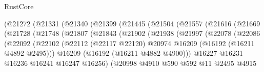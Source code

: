 \begin{lexlean}{RustCore}
\begin{coremodule}
                            (@21272
                              (@21331
                                (@21340
                                  (@21399
                                    (@21445
                                      (@21504
                                        (@21557
                                          (@21616
                                            (@21669
                                              (@21728
                                                (@21748
                                                  (@21807
                                                    (@21843
                                                      (@21902
                                                        (@21938
                                                          (@21997
                                                            (@22078
                                                              (@22086
                                                                (@22092
                                                                  (@22102
                                                                    (@22112
                                                                      (@22117 @22120)
                                                                      @20974
                                                                      @16209
                                                                      (@16192 (@16211 @4892 @2495)))
                                                                    @16209
                                                                    (@16192 (@16211 @4882 @4900)))
                                                                  @16227
                                                                  @16231
                                                                  @16236
                                                                  @16241
                                                                  @16247
                                                                  @16256)
                                                                (@20998
                                                                  @4910
                                                                  @590
                                                                  @592
                                                                  @11
                                                                  @2495
                                                                  @4915

\end{coremodule}
\end{lexlean}
